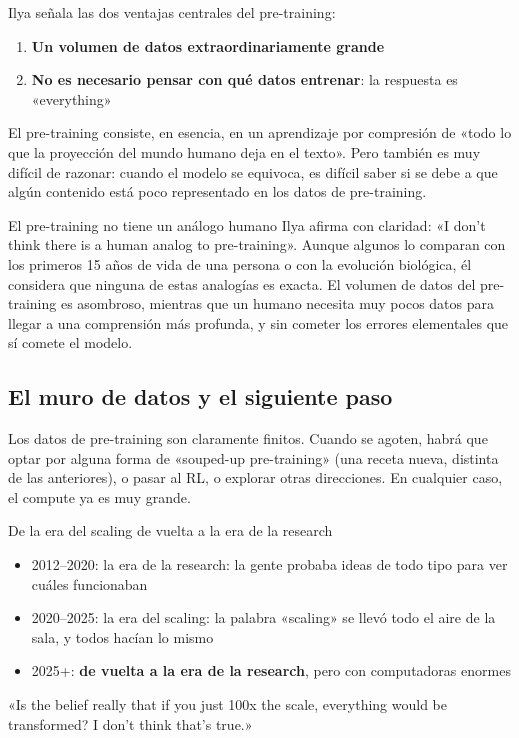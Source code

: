 \documentclass[a4paper]{article}
\begin{document}
Ilya señala las dos ventajas centrales del pre-training:
\begin{enumerate}
    \item \textbf{Un volumen de datos extraordinariamente grande}
    \item \textbf{No es necesario pensar con qué datos entrenar}: la respuesta es «everything»
\end{enumerate}

El pre-training consiste, en esencia, en un aprendizaje por compresión de «todo lo que la proyección del mundo humano deja en el texto». Pero también es muy difícil de razonar: cuando el modelo se equivoca, es difícil saber si se debe a que algún contenido está poco representado en los datos de pre-training.

\begin{warningbox}{El pre-training no tiene un análogo humano}
Ilya afirma con claridad: «I don't think there is a human analog to pre-training». Aunque algunos lo comparan con los primeros 15 años de vida de una persona o con la evolución biológica, él considera que ninguna de estas analogías es exacta. El volumen de datos del pre-training es asombroso, mientras que un humano necesita muy pocos datos para llegar a una comprensión más profunda, y sin cometer los errores elementales que sí comete el modelo.
\end{warningbox}

\subsection{El muro de datos y el siguiente paso}

Los datos de pre-training son claramente finitos. Cuando se agoten, habrá que optar por alguna forma de «souped-up pre-training» (una receta nueva, distinta de las anteriores), o pasar al RL, o explorar otras direcciones. En cualquier caso, el compute ya es muy grande.

\begin{importantbox}{De la era del scaling de vuelta a la era de la research}
\begin{itemize}
    \item 2012--2020: la era de la research: la gente probaba ideas de todo tipo para ver cuáles funcionaban
    \item 2020--2025: la era del scaling: la palabra «scaling» se llevó todo el aire de la sala, y todos hacían lo mismo
    \item 2025+: \textbf{de vuelta a la era de la research}, pero con computadoras enormes
\end{itemize}
«Is the belief really that if you just 100x the scale, everything would be transformed? I don't think that's true.»
\end{importantbox}
\end{document}
